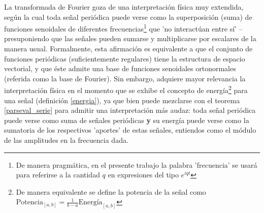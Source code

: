 \documentclass[12pt,a4paper]{mitthesis}
\begin{document}


La transformada de Fourier goza de una interpretación física muy extendida, seg\'un la cual 
toda se\~nal
peri\'odica puede verse como la superposici\'on (suma) de funciones senoidales de diferentes
frecuencias\footnote{De manera pragm\'atica, en el presente trabajo la palabra 'frecuencia' se usar\'a
para referirse a la cantidad $q$ en expresiones del tipo $e^{i q t}$} que 'no interact\'uan entre s\'i' 
--presuponiendo que
las se\~nales pueden sumarse y multiplicarse por escalares de la manera usual. 
Formalmente, esta afirmaci\'on es equivalente a que el conjunto de funciones peri\'odicas (suficientemente
regulares) tiene la estructura de espacio vectorial, y que \'este admite una base de funciones
senoidales ortonormales (referida como la base de Fourier). 
Sin embargo, adquiere mayor relevancia
la interpretaci\'on f\'isica en el momento
que se exhibe el concepto de energ\'ia\footnote{De manera equivalente se define la potencia de la 
se\~nal como $\text{Potencia}_{[a,b]} = \frac{1}{b-a} \text{Energ\'ia}_{[a,b]}$} 
para una se\~nal (definici\'on \ref{energia}), ya que 
bien puede mezclarse con el teorema \ref{parseval_serie} para admitir una interpretaci\'on m\'as
audaz: toda se\~nal peri\'odica puede verse como suma de se\~nales peri\'odicas \textbf{y}
su energ\'ia puede verse como la sumatoria de los respectivos 'aportes' de estas se\~nales,
entiendos como el m\'odulo de las amplitudes en la frecuencia dada.

\end{document}
